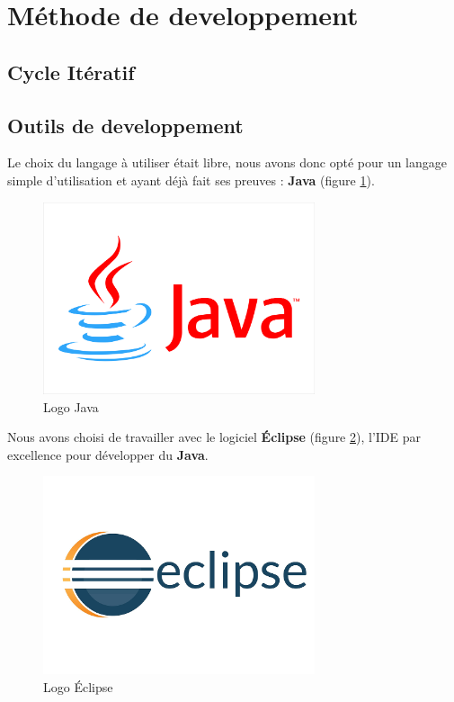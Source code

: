 \section{Méthode de developpement}


\subsection{Cycle Itératif}


\subsection{Outils de developpement}
Le choix du langage à utiliser était libre, nous avons donc opté pour un langage simple d'utilisation et ayant déjà fait ses preuves : \textbf{Java} (figure \ref{java_logo}).

\begin{figure}[!h]
\centering
\includegraphics[width=8cm]{images/activite/javaLogo.png}
\caption{Logo Java}
\label{java_logo}
\end{figure}

Nous avons choisi de travailler avec le logiciel \textbf{Éclipse} (figure \ref{eclipse_logo}), l'\gls{IDE} par excellence pour développer du \textbf{Java}.

\begin{figure}[H]
\centering
\includegraphics[width=8cm]{images/activite/eclipseLogo.png}
\caption{Logo Éclipse}
\label{eclipse_logo}
\end{figure}

